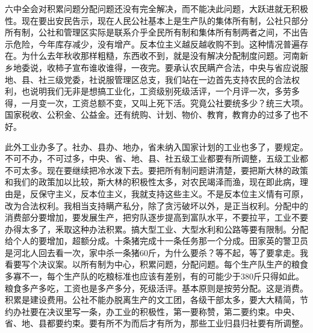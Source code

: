 六中全会对积累问题分配问题还没有完全解决，而不能决此问题，大跃进就无积极性。现在要出安民告示，现在人民公社基本上是生产队的集体所有制，公社只部分所有制，公社和管理区实际是联系介乎全民所有制和集体所有制两者之间，不出告示危险，今年库存减少，没有增产。反本位主义越反越收购不到。这种情况普遍存在。为什么去年秋收那样粗糙，东西收不到，就是没有解决分配制度问题。河南新乡地委说，收柿子宣布谁收谁得，一夜完。要承认农民瞒产合法，中央与省应说服地、县、社三级党委，社说服管理区总支，我们站在一边首先支持农民的合法权利，也说明我们无非是想搞工业化，工资级别死级活评，一个月评一次，多劳多得，一月变一次，工资总额不变，又叫上死下活。究竟公社要统多少？统三大项。国家税收、公积金、公益金。还有统购、计划、物价、教育，教育办的过多了也不好。

此外工业办多了。社办、县办、地办，省未纳入国家计划的工业也多了，要规定。不可不办，不可过多，中央、省、地、县、社五级工业都要有所调整，五级工业都不可太多。现在要继续把冷水泼下去。要把所有制问题讲清楚，要把斯大林的政策和我们的政策加以比较，斯大林的积极性太多，对农民竭泽而渔，现在即此病，理由是，反保守主义，反本位主义，我就支持这些主义。不是反本位主义情有可原，改为合法权利。我相当支持瞒产私分，除了贪污破坏以外，是正当权利。分配中的消费部分要增加，要发展生产，把穷队逐步提高到富队水平，不要拉平，工业不要办得太多了，釆取这种办法积累。搞大型工业、大型水利和公路等要有限制。分配给个人的要增加，超额分成。十条猪完成十一条任务那一个分成。田家英的警卫员是河北人回去看一次，家中杀一条猪60斤，为什么要杀？等不起，等了要拿走。我看要写个决议案。以所有制为中心，积累问题，分配问题。每个生产队生产的粮食多寡不一，每个生产队的吃粮标准也应该有差别，有的可能少于380斤只得如此。粮食多产多吃，工资也是多产多分，死级活评。基本原则是按劳分配。这是消费。积累是建设费用。公社不能办脱离生产的文工团，各级干部太多，要大大精简，节约办社要在决议里写一条，办工业的积极性，第一要称赞，第二要约束。中央、省、地、县都要约束。要有所不为而后才有所为，那些工业归县归社要有所调整。

